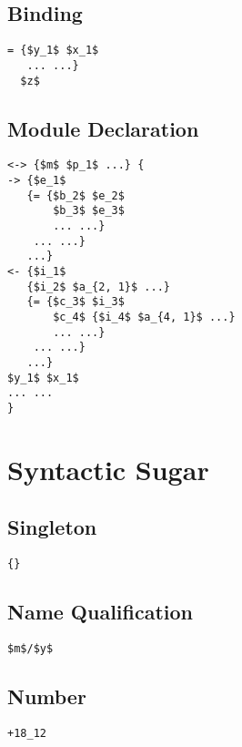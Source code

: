 \documentclass{article}
\begin{document}
\begin{multicols}
\subsection*{Binding}
\begin{lstlisting}[mathescape]
= {$y_1$ $x_1$
   ... ...}
  $z$
\end{lstlisting}

\subsection*{Module Declaration}
\begin{lstlisting}[mathescape]
<-> {$m$ $p_1$ ...} {
-> {$e_1$
   {= {$b_2$ $e_2$
       $b_3$ $e_3$
       ... ...}
    ... ...}
   ...}
<- {$i_1$
   {$i_2$ $a_{2, 1}$ ...}
   {= {$c_3$ $i_3$
       $c_4$ {$i_4$ $a_{4, 1}$ ...}
       ... ...}
    ... ...}
   ...}
$y_1$ $x_1$
... ...
}
\end{lstlisting}

\columnbreak

\section*{Syntactic Sugar}

\subsection*{Singleton}
\begin{lstlisting}[mathescape]
{}
\end{lstlisting}

\subsection*{Name Qualification}
\begin{lstlisting}[mathescape]
$m$/$y$
\end{lstlisting}

\subsection*{Number}
\begin{lstlisting}[mathescape]
+18_12
\end{lstlisting}


\end{multicols}
\end{document}
